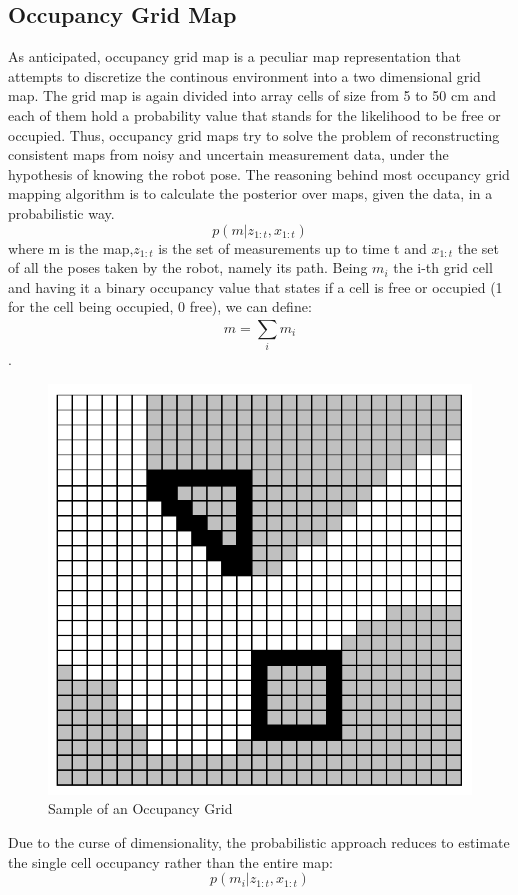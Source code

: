 \subsection{Occupancy Grid Map}
As anticipated, occupancy grid map is a peculiar map representation that attempts to discretize the continous environment into a two dimensional grid map. The grid map is again divided into array cells of size from 5 to 50 cm and each of them hold a probability value that stands for the likelihood to be free or occupied.
Thus, occupancy grid maps try to solve the problem of reconstructing consistent maps from noisy and uncertain measurement data, under the hypothesis of knowing the robot pose. 
The reasoning behind most occupancy grid mapping algorithm is to calculate the posterior over maps, given the data, in a probabilistic way.
\begin{equation}
    p(m | z_{1:t},x_{1:t})
\end{equation}
where m is the map,$z_{1:t}$ is the set of measurements up to time t and $x_{1:t}$ the set of all the poses taken by the robot, namely its path.
Being $m_{i}$ the i-th grid cell and having it a binary occupancy value that states if a cell is free or occupied (1 for the cell being occupied, 0 free), we can define:
\begin{equation}
m = \sum_{i}^{}{m_{i}}    
\end{equation}.
\begin{figure}[H]
    \centering
    \includegraphics[scale=0.5]{Images/Chapter 4/occupancygrid.png}
    \caption{Sample of an Occupancy Grid}
    \label{fig:occupancygrid}
\end{figure}
Due to the curse of dimensionality, the probabilistic approach reduces to estimate the single cell occupancy rather than the entire map:
\begin{equation}
    p(m_{i} | z_{1:t},x_{1:t})
\end{equation}

